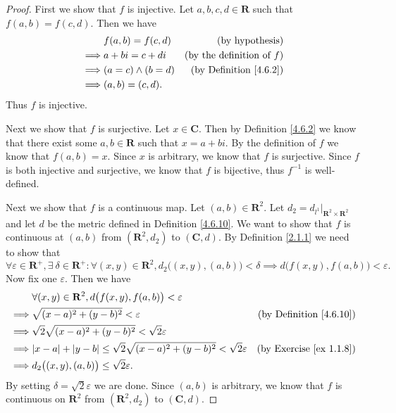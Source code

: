 \begin{proof}
    First we show that \(f\) is injective.
    Let \(a, b, c, d \in \mathbf{R}\) such that \(f(a, b) = f(c, d)\).
    Then we have
    \begin{align*}
                 & f(a, b) = f(c, d)     & \text{(by hypothesis)}              \\
        \implies & a + bi = c + di       & \text{(by the definition of \(f\))} \\
        \implies & (a = c) \land (b = d) & \text{(by Definition \ref{4.6.2})}  \\
        \implies & (a, b) = (c, d).
    \end{align*}
    Thus \(f\) is injective.

    Next we show that \(f\) is surjective.
    Let \(x \in \mathbf{C}\).
    Then by Definition \ref{4.6.2} we know that there exist some \(a, b \in \mathbf{R}\) such that \(x = a + bi\).
    By the definition of \(f\) we know that \(f(a, b) = x\).
    Since \(x\) is arbitrary, we know that \(f\) is surjective.
    Since \(f\) is both injective and surjective, we know that \(f\) is bijective, thus \(f^{-1}\) is well-defined.

    Next we show that \(f\) is a continuous map.
    Let \((a, b) \in \mathbf{R}^2\).
    Let \(d_2 = d_{l^1}|_{\mathbf{R}^2 \times \mathbf{R}^2}\) and let \(d\) be the metric defined in Definition \ref{4.6.10}.
    We want to show that \(f\) is continuous at \((a, b)\) from \((\mathbf{R}^2, d_2)\) to \((\mathbf{C}, d)\).
    By Definition \ref{2.1.1} we need to show that
    \[
        \forall \varepsilon \in \mathbf{R}^+, \exists\ \delta \in \mathbf{R}^+ : \forall (x, y) \in \mathbf{R}^2, d_2\big((x, y), (a, b)\big) < \delta \implies d\big(f(x, y), f(a, b)\big) < \varepsilon.
    \]
    Now fix one \(\varepsilon\).
    Then we have
    \begin{align*}
                 & \forall (x, y) \in \mathbf{R}^2, d\big(f(x, y), f(a, b)\big) < \varepsilon                                                          \\
        \implies & \sqrt{(x - a)^2 + (y - b)^2} < \varepsilon                                                    & \text{(by Definition \ref{4.6.10})} \\
        \implies & \sqrt{2} \sqrt{(x - a)^2 + (y - b)^2} < \sqrt{2} \varepsilon                                                                        \\
        \implies & \abs*{x - a} + \abs*{y - b} \leq \sqrt{2} \sqrt{(x - a)^2 + (y - b)^2} < \sqrt{2} \varepsilon & \text{(by Exercise \ref{ex 1.1.8})} \\
        \implies & d_2\big((x, y), (a, b)\big) \leq \sqrt{2} \varepsilon.
    \end{align*}
    By setting \(\delta = \sqrt{2} \varepsilon\) we are done.
    Since \((a, b)\) is arbitrary, we know that \(f\) is continuous on \(\mathbf{R}^2\) from \((\mathbf{R}^2, d_2)\) to \((\mathbf{C}, d)\).


\end{proof}
